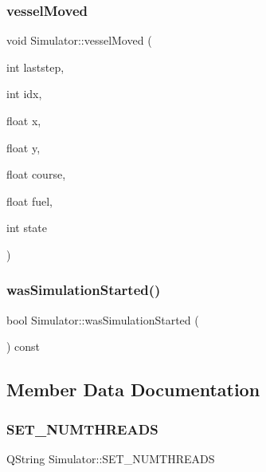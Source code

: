 \subsubsection{\texorpdfstring{vesselMoved}{vesselMoved}}
{\footnotesize\ttfamily void Simulator\+::vessel\+Moved (\begin{DoxyParamCaption}\item[{int}]{laststep,  }\item[{int}]{idx,  }\item[{float}]{x,  }\item[{float}]{y,  }\item[{float}]{course,  }\item[{float}]{fuel,  }\item[{int}]{state }\end{DoxyParamCaption})\hspace{0.3cm}{\ttfamily [signal]}}

\mbox{\label{class_simulator_ac1336ca0d33dbb804fa5f4d6409a98e4}} 
\subsubsection{\texorpdfstring{wasSimulationStarted()}{wasSimulationStarted()}}
{\footnotesize\ttfamily bool Simulator\+::was\+Simulation\+Started (\begin{DoxyParamCaption}{ }\end{DoxyParamCaption}) const}



\subsection{Member Data Documentation}
\mbox{\label{class_simulator_a7b69a3563727bc4210ca23939d341352}} 
\subsubsection{\texorpdfstring{SET\_NUMTHREADS}{SET\_NUMTHREADS}}
{\footnotesize\ttfamily Q\+String Simulator\+::\+S\+E\+T\+\_\+\+N\+U\+M\+T\+H\+R\+E\+A\+DS\hspace{0.3cm}{\ttfamily [static]}}

